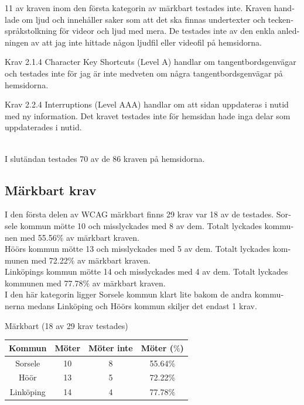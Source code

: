 \documentclass[11p]{article}
\begin{document}
\begin{otherlanguage}{swedish}
    11 av kraven inom den första kategorin av märkbart testades inte.
    Kraven handlade om ljud och innehåller saker som att det ska finnas undertexter och teckenspråkstolkning för videor och ljud med mera.
    De testades inte av den enkla anledningen av att jag inte hittade någon ljudfil eller videofil på hemsidorna.

    Krav 2.1.4 Character Key Shortcuts (Level A) handlar om tangentbordsgenvägar och testades inte för jag är inte medveten om några tangentbordsgenvägar på hemsidorna.

    Krav 2.2.4 Interruptions (Level AAA) handlar om att sidan uppdateras i nutid med ny information.
    Det kravet testades inte för hemsidan hade inga delar som uppdaterades i nutid.

  \\  I slutändan testades 70 av de 86 kraven på hemsidorna.
    \subsection{Märkbart krav}
    I den första delen av WCAG märkbart finns 29 krav var 18 av de testades.
    Sorsele kommun mötte 10 och misslyckades med 8 av dem.
    Totalt lyckades kommunen med 55.56$\%$ av märkbart kraven.
    \\Höörs kommun mötte 13 och misslyckades med 5 av dem.
    Totalt lyckades kommunen med 72.22$\%$ av märkbart kraven.
    \\Linköpings kommun mötte 14 och misslyckades med 4 av dem.
    Totalt lyckades kommunen med 77.78$\%$ av märkbart kraven.
    \\I den här kategorin ligger Sorsele kommun klart lite bakom de andra kommunerna medans Linköping och Höörs kommun skiljer det endast 1 krav.

    \begin{center}
    Märkbart (18 av 29 krav testades)

    \begin{tabular}{ |c|c|c|c|}
        \hline
        Kommun & Möter & Möter inte & Möter ($\%$) \\  \hline
        Sorsele & 10 & 8 & 55.64$\%$ \\ \hline
        Höör & 13 & 5 & 72.22$\%$ \\ \hline
        Linköping & 14 & 4 & 77.78$\%$ \\ \hline
    \end{tabular}
    \end{center}


\end{otherlanguage}
\end{document}
